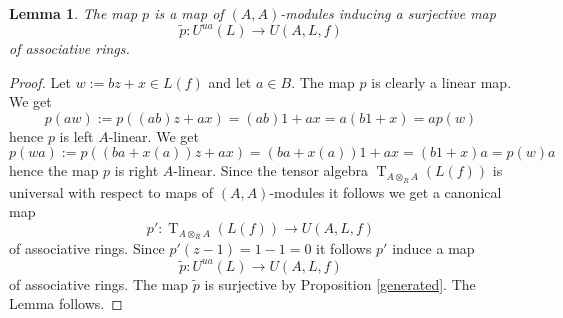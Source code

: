 \documentclass{amsart}
\theoremstyle{plain}
\newtheorem{lemma}[theorem]{Lemma}
\theoremstyle{definition}
\theoremstyle{remark}
\numberwithin{equation}{theorem}
\begin{document}
\begin{lemma} \label{2ideal} The map $p$ is a map of $({A},{A})$-modules inducing a surjective map 
\[ \tilde{p}:{U^{ua}}(L)\rightarrow U({A},L,f) \]
of associative rings.
\end{lemma}
\begin{proof} Let $w:=bz+x\in L(f)$ and let $a\in B$. The map $p$ is clearly a linear map.
We get
\[p(aw):=p((ab)z+ax)=(ab)1+ax=a(b1+x)=ap(w) \]
hence $p$ is left ${A}$-linear. We get
\[ p(wa):=p((ba+x(a))z+ax)=(ba+x(a))1+ax=(b1+x)a=p(w)a\]
hence the map $p$ is right ${A}$-linear. 
Since the tensor algebra ${\operatorname{T}}_{{A}\otimes_{R} {A}}(L(f))$ is universal with respect to maps
of $({A},{A})$-modules it follows we get a canonical map
\[ p': {\operatorname{T}}_{{A}\otimes_{R} {A}}(L(f))\rightarrow U({A},L,f) \]
of associative rings. Since $p'(z-1)=1-1=0$ it follows $p'$ induce a map
\[ \tilde{p}:{U^{ua}}(L)\rightarrow U({A},L,f) \]
of associative rings. The map $\tilde{p}$ is surjective by Proposition \ref{generated}. The Lemma follows.
\end{proof}
\end{document}
